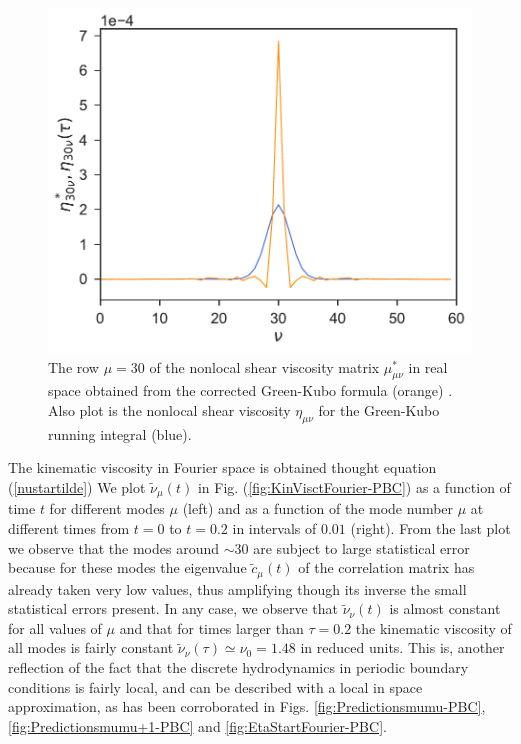 \documentclass[b5paper,openright,10pt]{book}
\begin{document}
\begin{figure}[h!]
  \centering
\includegraphics[scale=0.41]{CompareEtas-PBC}
\caption[Comparison $\eta^*_{30,\nu}$ and $eta_{30,\nu}$ for an unconfined fluid]{The row $\mu=30$ of the nonlocal shear viscosity matrix $\mu^{*}_{\mu\nu}$ in real space obtained from the corrected Green-Kubo formula (orange) . Also plot is the nonlocal shear viscosity $\eta_{\mu\nu}$ for the Green-Kubo running integral (blue).}
\label{fig:CompareEtas-PBC}
\end{figure}


The kinematic viscosity  in Fourier space is  obtained thought equation (\ref{nustartilde})
We plot $\tilde{\nu}_\mu(t)$  in Fig.  (\ref{fig:KinVisctFourier-PBC}) as a  function of time
$t$ for  different modes  $\mu$ (left)  and as a  function of  the mode
number $\mu$  at different times from $t=0$ to $t=0.2$ in intervals of $0.01$ (right). From
the last plot  we observe that the modes around  $\sim 30$ are subject
to  large statistical  error because  for these  modes the  eigenvalue
$\tilde{c}_\mu(t)$ of  the correlation  matrix has already  taken very
low values, thus  amplifying though its inverse  the small statistical
errors present. In  any case, we observe  that $\tilde{\nu}_\nu(t)$ is
almost constant for all values of $\mu$ and that for times larger than
$\tau=0.2$ the  kinematic viscosity  of all  modes is  fairly constant
$\tilde{\nu}_\nu(\tau)\simeq\nu_0=1.48$  in  reduced units.  This  is,
another reflection  of the  fact that the  discrete hydrodynamics in 
periodic boundary conditions is fairly local, and can be described with
 a local in space approximation, as has been corroborated in Figs. 
 \ref{fig:Predictionsmumu-PBC}, \ref{fig:Predictionsmumu+1-PBC} and \ref{fig:EtaStartFourier-PBC}.
\end{document}

